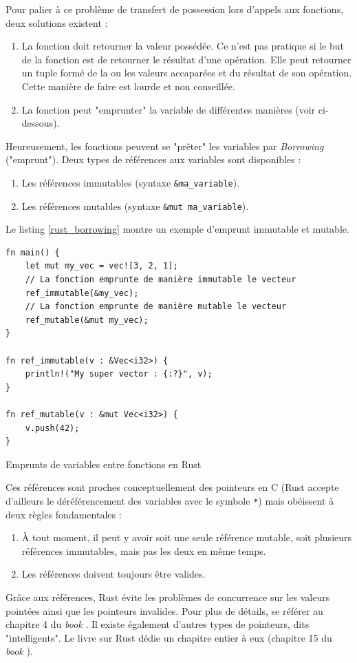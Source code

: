 \documentclass[a4paper, 12pt]{article}
\newenvironment{code}{\captionsetup{type=listing}}{}
\begin{document}
\bigbreak
Pour palier à ce problème de transfert de possession lors d'appels aux fonctions, deux solutions existent :
\begin{enumerate}
    \item La fonction doit retourner la valeur possédée. Ce n'est pas pratique si le but de la fonction 
        est de retourner le résultat d'une opération. Elle peut retourner un tuple formé de la ou 
        les valeurs accaparées et du résultat de son opération. Cette manière de faire est lourde 
        et non conseillée.
    \item La fonction peut "emprunter" la variable de différentes manières (voir ci-dessous).
\end{enumerate}
Heureusement, les fonctions peuvent se "prêter" les variables par \textit{Borrowing} ("emprunt").
Deux types de références aux variables sont disponibles :
\begin{enumerate}
    \item Les références immutables (syntaxe \texttt{&ma_variable}).
    \item Les références mutables (syntaxe \texttt{&mut ma_variable}).
\end{enumerate}
Le listing \ref{rust_borrowing} montre un exemple d'emprunt immutable et mutable.
\bigbreak
\begin{code}
    \begin{verbatim}
fn main() {
    let mut my_vec = vec![3, 2, 1]; 
    // La fonction emprunte de manière immutable le vecteur
    ref_immutable(&my_vec);
    // La fonction emprunte de manière mutable le vecteur
    ref_mutable(&mut my_vec);
}

fn ref_immutable(v : &Vec<i32>) {
    println!("My super vector : {:?}", v);
}

fn ref_mutable(v : &mut Vec<i32>) {
    v.push(42);
}
    \end{verbatim}
    \caption{Emprunts de variables entre fonctions en Rust}
    \label{rust_borrowing}
\end{code}
\bigbreak
Ces références sont proches conceptuellement des pointeurs en C (Rust accepte d'ailleurs le 
déréférencement des variables avec le symbole \texttt{*}) mais obéissent à deux 
règles fondamentales :
\begin{enumerate}
    \item À tout moment, il peut y avoir soit une seule référence mutable, soit plusieurs 
        références immutables, mais pas les deux en même temps.
    \item Les références doivent toujours être valides.
\end{enumerate}
Grâce aux références, Rust évite les problèmes de concurrence sur les valeurs pointées ainsi que 
les pointeurs invalides. Pour plus de détails, se référer au chapitre 4 du \textit{book} \cite{ref0}.
Il existe également d'autres types de pointeurs, dits "intelligents". Le livre sur Rust dédie un 
chapitre entier à eux (chapitre 15 du \textit{book} \cite{ref0}).
\end{document}
